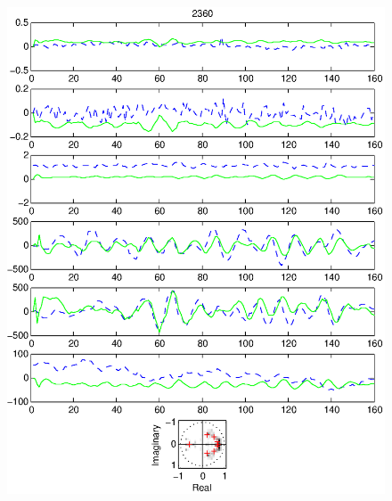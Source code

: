 \documentclass{article}
\begin{document}
\begin{figure}[htb!]\centering
\includegraphics{2360.eps}
\end{figure}\clearpage
\end{document}
